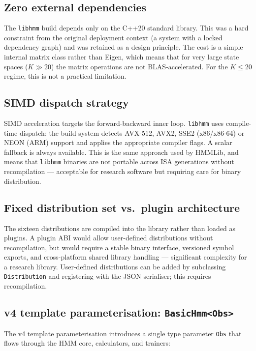 \documentclass[11pt]{article}
\begin{document}
\subsection{Zero external dependencies}

The \texttt{libhmm} build depends only on the C++20 standard library.
This was a hard constraint from the original deployment context
(a system with a locked dependency graph) and was retained as a
design principle.
The cost is a simple internal matrix class rather than Eigen, which
means that for very large state spaces ($K \gg 20$) the matrix operations
are not BLAS-accelerated.
For the $K \leq 20$ regime, this is not a practical limitation.

\subsection{SIMD dispatch strategy}

SIMD acceleration targets the forward-backward inner loop.
\texttt{libhmm} uses compile-time dispatch: the build system detects
AVX-512, AVX2, SSE2 (x86/x86-64) or NEON (ARM) support and applies
the appropriate compiler flags.
A scalar fallback is always available.
This is the same approach used by HMMLib, and means that
\texttt{libhmm} binaries are not portable across ISA generations
without recompilation --- acceptable for research software but
requiring care for binary distribution.

\subsection{Fixed distribution set vs.\ plugin architecture}

The sixteen distributions are compiled into the library rather than
loaded as plugins.
A plugin ABI would allow user-defined distributions without recompilation,
but would require a stable binary interface, versioned symbol exports, and
cross-platform shared library handling --- significant complexity for a
research library.
User-defined distributions can be added by subclassing
\texttt{Distribution} and registering with the JSON serialiser;
this requires recompilation.


\subsection{v4 template parameterisation: \texttt{BasicHmm<Obs>}}
\label{sec:v4template}

The v4 template parameterisation introduces a single type parameter
\texttt{Obs} that flows through the HMM core, calculators, and trainers:
\end{document}
